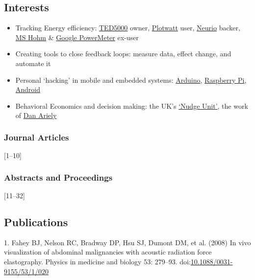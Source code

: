 \documentclass[]{article}
\begin{document}
\subsection{Interests}\label{interests}

\begin{itemize}
\itemsep1pt\parskip0pt
\item
  Tracking Energy efficiency:
  \href{http://www.theenergydetective.com/}{TED5000} owner,
  \href{plotwatt.com}{Plotwatt} user, \href{https://neur.io/}{Neurio}
  backer, \href{en.wikipedia.org/wiki/Hohm}{MS Hohm} \&
  \href{google.com/powermeter/about/}{Google PowerMeter} ex-user
\item
  Creating tools to close feedback loops: measure data, effect change,
  and automate it
\item
  Personal `hacking' in mobile and embedded systems:
  \href{http://www.arduino.cc/}{Arduino},
  \href{http://www.raspberrypi.org/}{Raspberry Pi},
  \href{http://www.android.com/}{Android}
\item
  Behavioral Economics and decision making: the UK's
  \href{https://www.gov.uk/government/organisations/behavioural-insights-team}{`Nudge
  Unit'}, the work of \href{http://danariely.com/}{Dan Ariely}
\end{itemize}

\subsubsection{Journal Articles}\label{journal-articles}

{[}1--10{]}

\subsubsection{Abstracts and
Proceedings}\label{abstracts-and-proceedings}

{[}11--32{]}

\subsection*{Publications}\label{publications}

1. Fahey BJ, Nelson RC, Bradway DP, Hsu SJ, Dumont DM, et al. (2008) In
vivo visualization of abdominal malignancies with acoustic radiation
force elastography. Physics in medicine and biology 53: 279--93.
doi:\href{http://dx.doi.org/10.1088/0031-9155/53/1/020}{10.1088/0031-9155/53/1/020}
\end{document}
